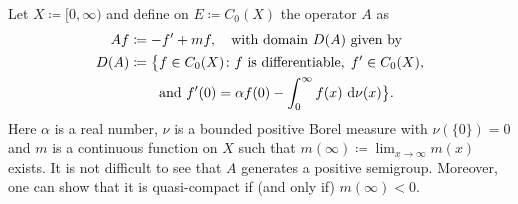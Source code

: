 \begin{example}\label{ex:b4-2.12}
	Let $X  \coloneq  [0,\infty)$ and define on $E  \coloneq  C_{0}(X)$ the operator $A$ as
\begin{equation}\label{eq:b4-2.8}
  \begin{aligned}
    Af   &\coloneq -f' + mf, \quad \text{with domain } D(A) \text{ given by} \\
    D(A) &\coloneq \bigl\{ f \in C_0(X) \colon f \text{ is differentiable},\;
                    f' \in C_0(X), \\
         &\phantom{{}\coloneq \bigl\{}
                    \text{and } f'(0) = \alpha f(0)
                    - \int_0^{\infty} f(x)\,\diff{\nu}(x) \bigr\}.
  \end{aligned}
\end{equation}
Here $\alpha$ is a real number, $\nu$ is a bounded positive Borel measure with $\nu(\{0\}) = 0$ and $m$ is a continuous function on $X$ such that $m(\infty)  \coloneq  \lim_{x \to \infty}m(x)$ exists. 
It is not difficult to see that $A$ generates a positive semigroup. 
Moreover, one can show that it is quasi-compact if (and only if) $m(\infty) < 0$. 


\end{example}
